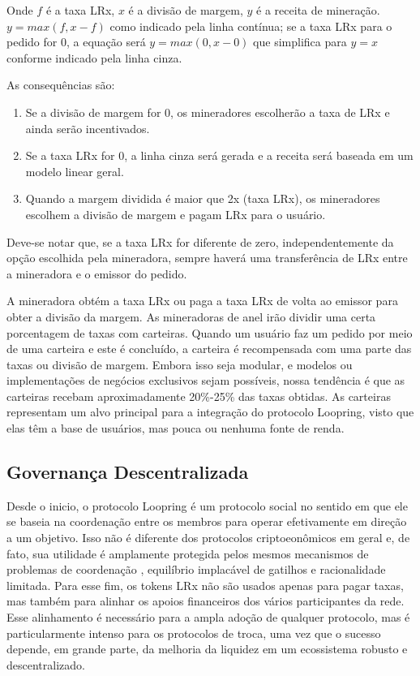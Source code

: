 \documentclass[UTF8,nofonts]{article}
\begin{document}
\begin{multicols}{2}
Onde $f$ é a taxa LRx, $x$ é a divisão de margem, $y$ é a receita de mineração. $y=max(f, x-f)$ como indicado pela linha contínua; se a taxa LRx para o pedido for $0$, a equação será $y=max(0, x - 0)$ que simplifica para $y=x$ conforme indicado pela linha cinza.


As consequências são:

\begin{enumerate}
	\item 	Se a divisão de margem for 0, os mineradores escolherão a taxa de LRx e ainda serão incentivados. 
	\item Se a taxa LRx for 0, a linha cinza será gerada e a receita será baseada em um modelo linear geral.
	\item Quando a margem dividida é maior que 2x (taxa LRx), os mineradores escolhem a divisão de margem e pagam LRx para o usuário.
\end{enumerate}


Deve-se notar que, se a taxa LRx for diferente de zero, independentemente da opção escolhida pela mineradora, sempre haverá uma transferência de LRx entre a mineradora e o emissor do pedido.

A mineradora obtém a taxa LRx ou paga a taxa LRx de volta ao emissor para obter a divisão da margem. As mineradoras de anel irão dividir uma certa porcentagem de taxas com carteiras. Quando um usuário faz um pedido por meio de uma carteira e este é concluído, a carteira é recompensada com uma parte das taxas ou divisão de margem. Embora isso seja modular, e modelos ou implementações de negócios exclusivos sejam possíveis, nossa tendência é que as carteiras recebam aproximadamente 20\%-25\%  das taxas obtidas. As carteiras representam um alvo principal para a integração do protocolo Loopring, visto que elas têm a base de usuários, mas pouca ou nenhuma fonte de renda.


\subsection{Governança Descentralizada}
Desde o inicio, o protocolo Loopring é um protocolo social no sentido em que ele se baseia na coordenação entre os membros para operar efetivamente em direção a um objetivo. Isso não é diferente dos protocolos criptoeonômicos em geral e, de fato, sua utilidade é amplamente protegida pelos mesmos mecanismos de problemas de coordenação \cite{vitalikgovernance}, equilíbrio implacável de gatilhos e racionalidade limitada. Para esse fim, os tokens LRx não são usados apenas para pagar taxas, mas também para alinhar os apoios financeiros dos vários participantes da rede. Esse alinhamento é necessário para a ampla adoção de qualquer protocolo, mas é particularmente intenso para os protocolos de troca, uma vez que o sucesso depende, em grande parte, da melhoria da liquidez em um ecossistema robusto e descentralizado.


\end{multicols}
\end{document}

